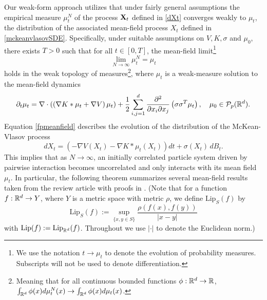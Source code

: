 \documentclass[english,reqno]{amsart}
\begin{document}
Our weak-form approach utilizes that under fairly general assumptions the empirical measure $\mu^N_t$ of the process $\mathbf{X}_t$ defined in \eqref{dXt} converges weakly to $\mu_t$, the distribution of the associated mean-field process $X_t$ defined in \eqref{mckeanvlasovSDE}. Specifically, under suitable assumptions on $V,K,\sigma$ and $\mu_0$, there exists $T>0$ such that for all $t\in[0,T]$, the mean-field limit\footnote{We use the notation $t\to \mu_t$ to denote the evolution of probability measures. Subscripts will not be used to denote differentiation.} 
\[\lim_{N \to \infty}\mu^N_t=\mu_t\]
holds in the weak topology of measures\footnote{Meaning that for all continuous bounded functions $\phi: \mathbb{R}^d\to \mathbb{R}$, $\int_{\mathbb{R}^d}\phi(x)d\mu^N_t(x)\to \int_{\mathbb{R}^d}\phi(x)d\mu_t(x)$.}, where $\mu_t$ is a weak-measure solution to the mean-field dynamics
\begin{equation}\label{fpmeanfield}
\partial_t \mu_t  = \nabla\cdot \left(\left(\nabla K*\mu_t+\nabla V\right)\mu_t\right) + \frac{1}{2}\sum_{i,j=1}^d\frac{\partial^2}{\partial x_i \partial x_j} \left(\sigma \sigma^T \mu_t\right), \quad \mu_0\in {\mathcal{P}}_p(\mathbb{R}^d).
\end{equation}
Equation \ref{fpmeanfield} describes the evolution of the distribution of the McKean-Vlasov process
\begin{equation}\label{mckeanvlasovSDE}
dX_t = \left(-\nabla V\left(X_t\right) -\nabla K*\mu_t\left(X_t\right)\right) dt + \sigma(X_t)\,dB_t.
\end{equation}
This implies that as $N\to \infty$, an initially correlated particle system driven by pairwise interaction becomes uncorrelated and only interacts with its mean field $\mu_t$. In particular, the following theorem summarizes several mean-field results taken from the review article \cite{jabin2017mean} with proofs in \cite{sznitman1991topics,meleard1996asymptotic}. (Note that for a function $f:\mathbb{R}^d\to Y$, where $Y$ is a metric space with metric $\rho$, we define $\text{Lip}_S(f)$ by 
\[\text{Lip}_S(f):=\sup_{\{x,y\in S\}} \frac{\rho(f(x),f(y))}{\left\vert x- y\right\vert}\]
with $\text{Lip}(f):=\text{Lip}_{\mathbb{R}^d}(f)$. Throughout we use $|\cdot|$ to denote the Euclidean norm.)
\end{document}
